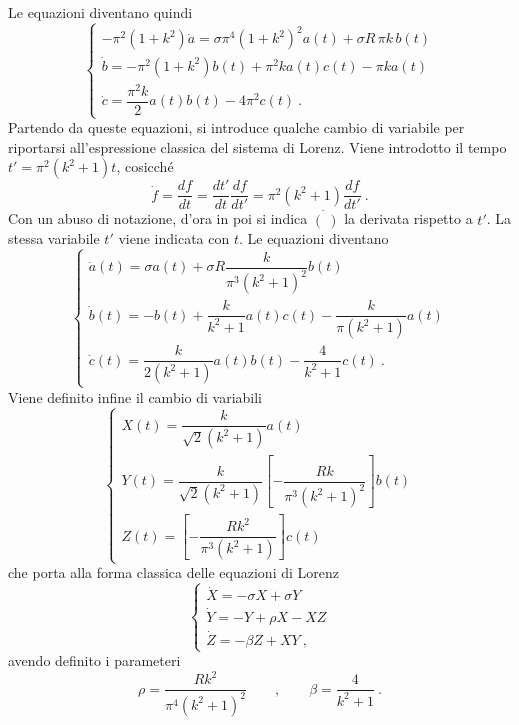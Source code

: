 \documentclass{article}
\begin{document}
%
\noindent
Le equazioni diventano quindi
\begin{equation}
    \begin{cases}
   - \pi^2 (1+k^2) \dot{a} = \sigma \pi^4 (1+k^2)^2 a(t) +  \sigma R \, \pi k \, b(t) \\
    \dot{b} = -\pi^2 (1+k^2) b(t) + \pi^2 k a(t)c(t)  - \pi k a(t)  \\
    \dot{c} = \dfrac{\pi^2 k}{2} a(t) b(t) - 4 \pi^2 c(t) \ .
    \end{cases}
\end{equation}
Partendo da queste equazioni, si introduce qualche cambio di variabile per riportarsi all'espressione classica del sistema di Lorenz.
Viene introdotto il tempo $t' = \pi^2 (k^2 + 1) t$, cosicché
\begin{equation}
    \dot{f} = \dfrac{df}{dt} = \dfrac{dt'}{dt}\dfrac{df}{dt'} =
    \pi^2 (k^2 + 1) \dfrac{df}{dt'} \ .
\end{equation}
Con un abuso di notazione, d'ora in poi si indica $\dot{(\ )}$ la derivata rispetto a $t'$. La stessa variabile $t'$ viene indicata con $t$. Le equazioni diventano
\begin{equation}
    \begin{cases}
    \dot{a}(t) = \sigma a(t) +  \sigma R \dfrac{k}{\pi^3 (k^2+1)^2} b(t) \\
    \dot{b}(t) = - b(t) + \dfrac{ k}{k^2+1} a(t)c(t)  - \dfrac{ k}{\pi(k^2+1)} a(t)  \\
    \dot{c}(t) = \dfrac{k}{2(k^2+1)} a(t) b(t) - \dfrac{4}{k^2+1}  c(t) \ .
    \end{cases}
\end{equation}
Viene definito infine il cambio di variabili 
\begin{equation}
    \begin{cases}
     X(t) = \dfrac{k}{\sqrt{2}(k^2+1)} a(t) \\
     Y(t) = \dfrac{k}{\sqrt{2}(k^2+1)}
     \left[-\dfrac{R k}{\pi^3 (k^2+1)^2}\right] b(t) \\
     Z(t) = \left[-\dfrac{R k^2}{\pi^3 (k^2+1)}\right] c(t)
    \end{cases}
\end{equation}
che porta alla forma classica delle equazioni di Lorenz
\begin{equation}
    \begin{cases}
      \dot{X} = - \sigma X + \sigma Y \\
      \dot{Y} = - Y + \rho X - X Z \\
      \dot{Z} = - \beta Z + X Y \ ,
    \end{cases}
\end{equation}
avendo definito i parameteri 
\begin{equation}
    \rho = \dfrac{R k^2}{\pi^4 (k^2+1)^2} \qquad , \qquad
    \beta = \dfrac{4}{k^2+1} \ .
\end{equation}
\end{document}
